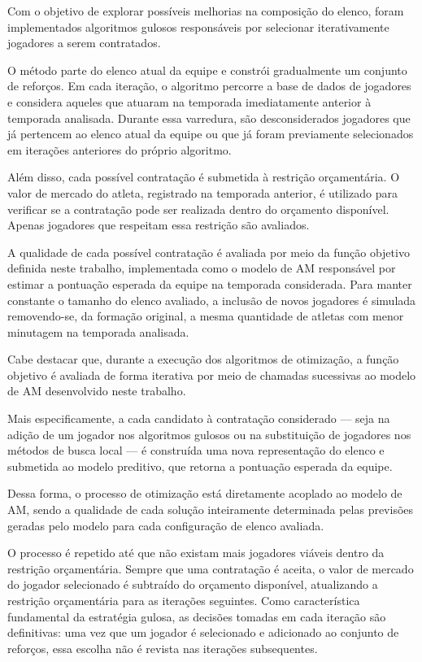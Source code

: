 Com o objetivo de explorar possíveis melhorias na composição do elenco, foram implementados algoritmos gulosos responsáveis por selecionar iterativamente 
jogadores a serem contratados.

O método parte do elenco atual da equipe e constrói gradualmente um conjunto de reforços. Em cada iteração, o algoritmo percorre a base de dados 
de jogadores e considera aqueles que atuaram na temporada imediatamente anterior à temporada analisada. Durante essa varredura, são desconsiderados 
jogadores que já pertencem ao elenco atual da equipe ou que já foram previamente selecionados em iterações anteriores do próprio algoritmo.

Além disso, cada possível contratação é submetida à restrição orçamentária. O valor de mercado do atleta, registrado na temporada anterior, é utilizado 
para verificar se a contratação pode ser realizada dentro do orçamento disponível. Apenas jogadores que respeitam essa restrição são avaliados.

A qualidade de cada possível contratação é avaliada por meio da função objetivo definida neste trabalho, implementada como o modelo de AM responsável 
por estimar a pontuação esperada da equipe na temporada considerada. Para manter constante o tamanho do elenco avaliado, a inclusão de novos jogadores 
é simulada removendo-se, da formação original, a mesma quantidade de atletas com menor minutagem na temporada analisada.

Cabe destacar que, durante a execução dos algoritmos de otimização, a função objetivo 
é avaliada de forma iterativa por meio de chamadas sucessivas ao modelo de AM 
desenvolvido neste trabalho. 

Mais especificamente, a cada candidato à contratação considerado — seja na adição 
de um jogador nos algoritmos gulosos ou na substituição de jogadores 
nos métodos de busca local — é construída uma nova representação do 
elenco e submetida ao modelo preditivo, que retorna a pontuação esperada da equipe. 

Dessa forma, o processo de otimização está diretamente acoplado ao modelo de AM, 
sendo a qualidade de cada solução inteiramente determinada pelas previsões 
geradas pelo modelo para cada configuração de elenco avaliada.

O processo é repetido até que não existam mais jogadores viáveis dentro da restrição orçamentária. Sempre que uma contratação é aceita, o valor 
de mercado do jogador selecionado é subtraído do orçamento disponível, atualizando a restrição orçamentária para as iterações seguintes. 
Como característica fundamental da estratégia gulosa, as decisões tomadas em cada iteração são definitivas: uma vez que um jogador é selecionado e 
adicionado ao conjunto de reforços, essa escolha não é revista nas iterações subsequentes.

